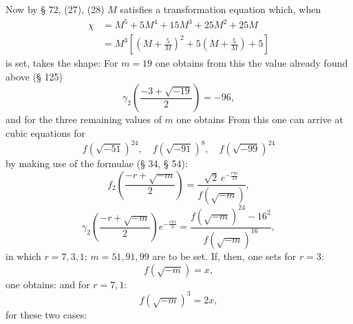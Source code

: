 
Now by § 72, (27), (28) $M$ satisfies a transformation equation which, when
\[
\begin{aligned}
\chi &= M^5 + 5M^4 + 15M^3 + 25M^2 + 25M\\
&= M^3\left[\left(M + \frac{5}{M}\right)^2 + 5\left(M + \frac{5}{M}\right) + 5\right]
\end{aligned}
\]
is set, takes the shape:
For $m = 19$ one obtains from this the value already found above (§ 125)
\[\gamma_2\left(\frac{-3+\sqrt{-19}}{2}\right) = -96,\]
and for the three remaining values of $m$ one obtains
From this one can arrive at cubic equations for
\[f\left(\sqrt{-51}\right)^{24}, \quad f\left(\sqrt{-91}\right)^{8}, \quad f\left(\sqrt{-99}\right)^{24}\]
by making use of the formulae (§ 34, § 54):
\[f_2\left(\frac{-r+\sqrt{-m}}{2}\right) = \frac{\sqrt{2}\, e^{-\frac{r\pi i}{24}}}{f(\sqrt{-m})},\]
\[\gamma_2\left(\frac{-r+\sqrt{-m}}{2}\right) e^{-\frac{r\pi i}{3}} = \frac{f(\sqrt{-m})^{24} - 16^2}{f(\sqrt{-m})^{16}},\]
in which $r = 7, 3, 1$; $m = 51, 91, 99$ are to be set. If, then, one sets for $r = 3$:
\[f(\sqrt{-m}) = x,\]
one obtains:
and for $r = 7, 1$:
\[f(\sqrt{-m})^3 = 2x,\]
for these two cases:
